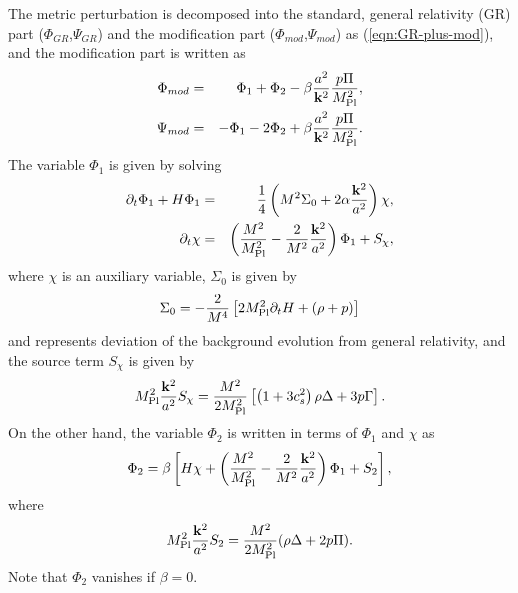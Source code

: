 The metric perturbation is decomposed into the standard, general
relativity (GR) part ($\Phi_{GR}$,$\Psi_{GR}$) and the modification part
($\Phi_{mod}$,$\Psi_{mod}$) as (\ref{eqn:GR-plus-mod}), and the
modification part is written as 
%
\begin{eqnarray}
 \Phi_{mod} & = & \Phi_1 + \Phi_2
  -\beta \frac{a^2}{{\bf k}^2}\frac{p\Pi}{M_{\rm Pl}^2}, \nonumber\\
 \Psi_{mod} & = & - \Phi_1 - 2\Phi_2
   +\beta \frac{a^2}{{\bf k}^2}\frac{p\Pi}{M_{\rm Pl}^2}.
\end{eqnarray}
The variable $\Phi_1$ is given by solving 
%
\begin{eqnarray}
 \partial_t\Phi_1 + H\Phi_1 & = & \frac{1}{4}
  \left(M^2\Sigma_0+2\alpha\frac{{\bf k}^2}{a^2}\right)\chi, \nonumber\\
 \partial_t\chi & = & 
  \left(\frac{M^2}{M_{\rm Pl}^2}
   -\frac{2}{M^2}\frac{{\bf k}^2}{a^2}\right)\Phi_1
  + S_{\chi},
  \label{eqn:master-eq-1st-again}
\end{eqnarray}
where $\chi$ is an auxiliary variable, $\Sigma_0$ is given by 
%
\begin{equation}
 \Sigma_0 = -\frac{2}{M^4}
  \left[2M_{\rm Pl}^2\partial_tH+(\rho+p)\right]
\end{equation}
and represents deviation of the background evolution from general
relativity, and the source term $S_{\chi}$ is given by 
%
\begin{equation}
 M_{\rm Pl}^2\frac{{\bf k}^2}{a^2}S_{\chi} = 
  \frac{M^2}{2M_{\rm Pl}^2}
  \left[\left(1+3c_s^2\right)\rho\Delta+3p\Gamma\right].
\end{equation}
On the other hand, the variable $\Phi_2$ is written in terms of $\Phi_1$ 
and $\chi$ as
%
\begin{equation}
 \Phi_2 = \beta\left[ H\chi + 
  \left(\frac{M^2}{M_{\rm Pl}^2}-\frac{2}{M^2}
   \frac{{\bf k}^2}{a^2}\right)\Phi_1 + S_2\right],
\end{equation}
where
%
\begin{equation}
 M_{\rm Pl}^2\frac{{\bf k}^2}{a^2}S_2 = 
  \frac{M^2}{2M_{\rm Pl}^2} (\rho\Delta+2p\Pi).
\end{equation}
Note that $\Phi_2$ vanishes if $\beta=0$. 


